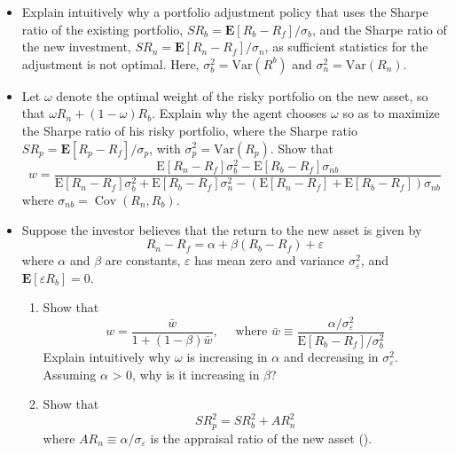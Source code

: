 \documentclass[11pt,green,twocol,citestyle=authoryear, bibstyle=authoryear]{elegantbook}
\begin{document}
\begin{problem}
    \begin{itemize}
        \item Explain intuitively why a portfolio adjustment policy that uses the Sharpe ratio of the existing portfolio, $ SR_b = \mathbf{E}[R_b - R_f] / \sigma_b $, and the Sharpe ratio of the new investment, $ SR_n = \mathbf{E}[R_n - R_f] / \sigma_n $, as sufficient statistics for the adjustment is not optimal. Here, $ \sigma_b^2 = \text{Var}(R^b) $ and $ \sigma_n^2 = \text{Var}(R_n) $.
        \item Let $\omega$ denote the optimal weight of the risky portfolio on the new asset, so that $ \omega R_n + (1 - \omega) R_b $. Explain why the agent chooses $\omega$ so as to maximize the Sharpe ratio of his risky portfolio, where the Sharpe ratio $ SR_p = \mathbf{E}[R_p - R_f] / \sigma_p$, with $ \sigma_p^2 = \text{Var}(R_p) $.  Show that
        \begin{equation*}
            w=\frac{\mathrm{E}\left[R_n-R_f\right] \sigma_b^2-\mathrm{E}\left[R_b-R_f\right] \sigma_{n b}}{\mathrm{E}\left[R_n-R_f\right] \sigma_b^2+\mathrm{E}\left[R_b-R_f\right] \sigma_n^2-\left(\mathrm{E}\left[R_n-R_f\right]+\mathrm{E}\left[R_b-R_f\right]\right) \sigma_{n b}}
        \end{equation*}
        where $ \sigma_{n b}=\operatorname{Cov}\left(R_n, R_b\right) $. 
        \item  Suppose the investor believes that the return to the new asset is given by
        \begin{equation*}
            R_n-R_f=\alpha+\beta\left(R_b-R_f\right)+\varepsilon
        \end{equation*}
        where $ \alpha $ and $ \beta $ are constants, $ \varepsilon $ has mean zero and variance $ \sigma_{\varepsilon}^2 $, and $ \mathbf{E}[\varepsilon R_b] = 0 $.
        \begin{enumerate}
            \item Show that
            \begin{equation*}
                w=\frac{\bar{w}}{1+(1-\beta) \bar{w}}, \quad \text { where } \bar{w} \equiv \frac{\alpha / \sigma_{\varepsilon}^2}{\mathrm{E}\left[R_b-R_f\right] / \sigma_b^2}
            \end{equation*}
            Explain intuitively why $ \omega $  is increasing in $ \alpha $  and decreasing in $ \sigma_{\varepsilon}^2 $. Assuming $ \alpha $ > 0, why is it increasing in $ \beta $?
            \item Show that
            \begin{equation*}
                S R_p^2=S R_b^2+A R_n^2
            \end{equation*} 
            where $ A R_n \equiv \alpha / \sigma_{\varepsilon} $ is the appraisal ratio of the new asset (\cite{Treynor_Black_1973}).


\end{enumerate}
\end{itemize}
\end{problem}
\end{document}

